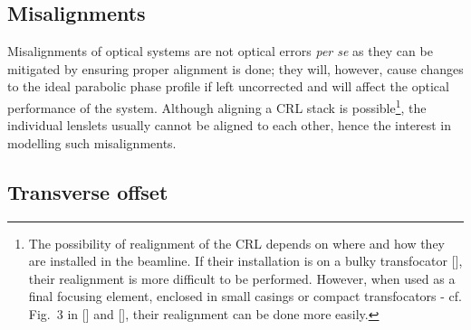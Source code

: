 \begin{refsection}
\section{Misalignments}\label{sec:misalignments}

Misalignments of optical systems are not optical errors \textit{per se} as they can be mitigated by ensuring proper alignment is done; they will, however, cause changes to the ideal parabolic phase profile if left uncorrected and will affect the optical performance of the system. Although aligning a CRL stack is possible\footnote{The possibility of realignment of the CRL depends on where and how they are installed in the beamline. If their installation is on a bulky transfocator [\cite{Vaughan2011}], their realignment is more difficult to be performed. However, when used as a final focusing element, enclosed in small casings or compact transfocators - cf. Fig.~3 in [\cite{Lengeler1999}] and [\cite{Kornemann2017, Narikovich2019}], their realignment can be done more easily.}, the individual lenslets usually cannot be aligned to each other, hence the interest in modelling such misalignments.

\subsection{Transverse offset}


\end{refsection}
